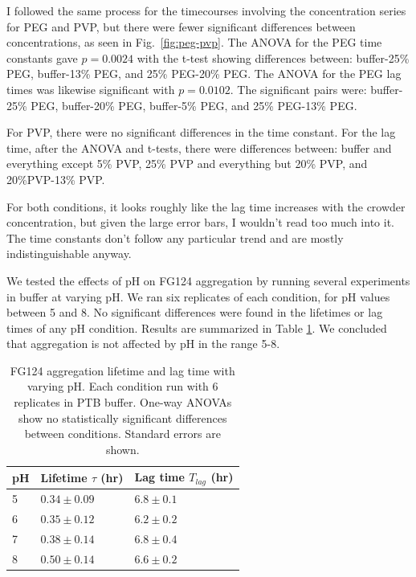 I followed the same process for the timecourses involving the concentration series for PEG and PVP, but there were fewer significant differences between concentrations, as seen in Fig.~\ref{fig:peg-pvp}.  The ANOVA for the PEG time constants gave $p=0.0024$ with the t-test showing differences between: buffer-25\% PEG, buffer-13\% PEG, and 25\% PEG-20\% PEG. The ANOVA for the PEG lag times was likewise significant with $p = 0.0102$.  The significant pairs were: buffer-25\% PEG, buffer-20\% PEG, buffer-5\% PEG, and 25\% PEG-13\% PEG.

For PVP, there were no significant differences in the time constant.  For the lag time, after the ANOVA and t-tests, there were differences between: buffer and everything except 5\% PVP, 25\% PVP and everything but 20\% PVP, and 20\%PVP-13\% PVP.

For both conditions, it looks roughly like the lag time increases with the crowder concentration, but given the large error bars, I wouldn't read too much into it.  The time constants don't follow any particular trend and are mostly indistinguishable anyway.

We tested the effects of pH on FG124 aggregation by running several experiments in buffer at varying pH.  We ran six replicates of each condition, for pH values between 5 and 8.  No significant differences were found in the lifetimes or lag times of any pH condition.  Results are summarized in Table \ref{table:FG124-pH}. We concluded that aggregation is not affected by pH in the range 5-8.

\begin{table}[b!]
  \caption{FG124 aggregation lifetime and lag time with varying pH. Each condition run with 6 replicates in PTB buffer.  One-way ANOVAs show no statistically significant differences between conditions.  Standard errors are shown.}
    \label{table:FG124-pH}
    \begin{tabular}{p{1cm}p{3cm}p{3cm}}
      pH & Lifetime $\tau$ (hr) & Lag time $T_{lag}$ (hr) \\
      \hline
      5 & $0.34 \pm 0.09$ & $6.8 \pm 0.1$ \\
      6 & $0.35 \pm 0.12$ & $6.2 \pm 0.2$ \\
      7 & $0.38 \pm 0.14$ & $6.8 \pm 0.4$ \\
      8 & $0.50 \pm 0.14$ & $6.6 \pm 0.2$ \\
    \end{tabular}
\end{table}

